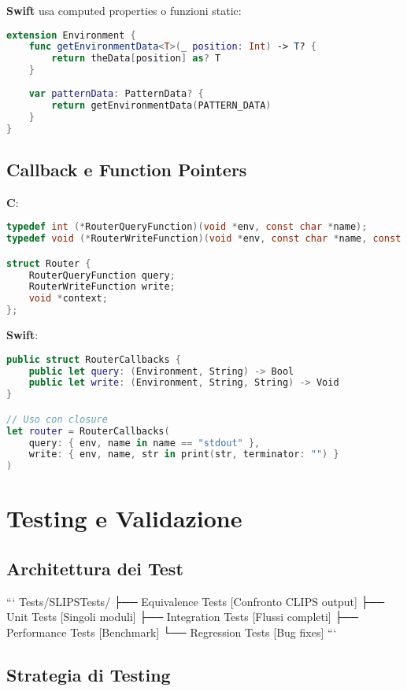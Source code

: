 \textbf{Swift} usa computed properties o funzioni static:
\begin{lstlisting}[language=Swift]
extension Environment {
    func getEnvironmentData<T>(_ position: Int) -> T? {
        return theData[position] as? T
    }
    
    var patternData: PatternData? {
        return getEnvironmentData(PATTERN_DATA)
    }
}
\end{lstlisting}

\subsection{Callback e Function Pointers}

\textbf{C}:
\begin{lstlisting}[language=C]
typedef int (*RouterQueryFunction)(void *env, const char *name);
typedef void (*RouterWriteFunction)(void *env, const char *name, const char *str);

struct Router {
    RouterQueryFunction query;
    RouterWriteFunction write;
    void *context;
};
\end{lstlisting}

\textbf{Swift}:
\begin{lstlisting}[language=Swift]
public struct RouterCallbacks {
    public let query: (Environment, String) -> Bool
    public let write: (Environment, String, String) -> Void
}

// Uso con closure
let router = RouterCallbacks(
    query: { env, name in name == "stdout" },
    write: { env, name, str in print(str, terminator: "") }
)
\end{lstlisting}

\section{Testing e Validazione}

\subsection{Architettura dei Test}

```
Tests/SLIPSTests/
├── Equivalence Tests      [Confronto CLIPS output]
├── Unit Tests             [Singoli moduli]
├── Integration Tests      [Flussi completi]
├── Performance Tests      [Benchmark]
└── Regression Tests       [Bug fixes]
```

\subsection{Strategia di Testing}

